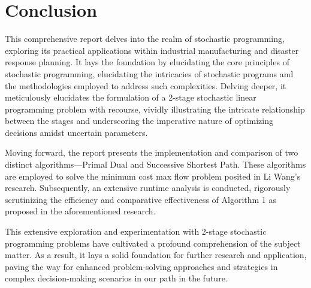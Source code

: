\newpage
\section{Conclusion}

	\qquad This comprehensive report delves into the realm of stochastic programming, exploring its practical applications within industrial manufacturing and disaster response planning. It lays the foundation by elucidating the core principles of stochastic programming, elucidating the intricacies of stochastic programs and the methodologies employed to address such complexities. Delving deeper, it meticulously elucidates the formulation of a 2-stage stochastic linear programming problem with recourse, vividly illustrating the intricate relationship between the stages and underscoring the imperative nature of optimizing decisions amidst uncertain parameters.

	\qquad Moving forward, the report presents the implementation and comparison of two distinct algorithms—Primal Dual and Successive Shortest Path. These algorithms are employed to solve the minimum cost max flow problem posited in Li Wang's research. Subsequently, an extensive runtime analysis is conducted, rigorously scrutinizing the efficiency and comparative effectiveness of Algorithm 1 as proposed in the aforementioned research.

	\qquad This extensive exploration and experimentation with 2-stage stochastic programming problems have cultivated a profound comprehension of the subject matter. As a result, it lays a solid foundation for further research and application, paving the way for enhanced problem-solving approaches and strategies in complex decision-making scenarios in our path in the future.
